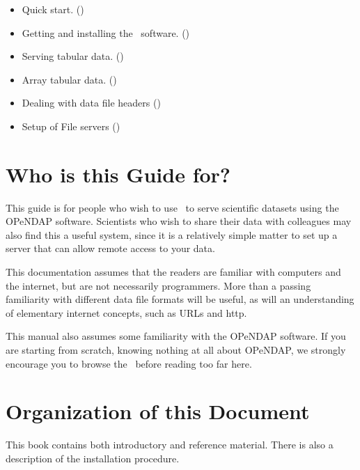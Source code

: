 \begin{itemize}

\item Quick start. ()

\item Getting and installing the \ffnd\ software. 
()

\item Serving tabular data. ()

\item Array tabular data. ()

\item Dealing with data file headers ()

\item Setup of File servers ()

\end{itemize}


\section{Who is this Guide for?}
\label{pref,who}

This guide is for people who wish to use \ffnd\ to serve scientific
datasets using the OPeNDAP software.  Scientists who wish to share their
data with colleagues may also find this a useful system, since it is a
relatively simple matter to set up a server that can allow remote
access to your data.

This documentation assumes that the readers are familiar with
computers and the internet, but are not necessarily programmers. More
than a passing familiarity with different data file formats will be
useful, as will an understanding of elementary internet concepts, such
as URLs and http.

This manual also assumes some familiarity with the OPeNDAP software.  If
you are starting from scratch, knowing nothing at all about OPeNDAP, we
strongly encourage you to browse the \DODSuser\ before reading too far
here.  

\section{Organization of this Document}

This book contains both introductory and reference material. There is
also a description of the installation procedure.

